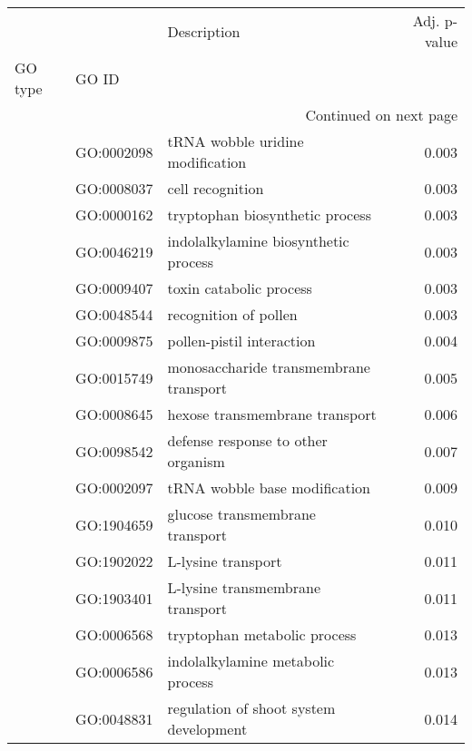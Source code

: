 \begin{longtable}{lllr}
\toprule
   &            &                                  Description &  Adj. p-value \\
GO type & GO ID &                                              &               \\
\midrule
\endhead
\midrule
\multicolumn{4}{r}{{Continued on next page}} \\
\midrule
\endfoot

\bottomrule
\endlastfoot
\multirow{45}{*}{BP} & GO:0002098 &             tRNA wobble uridine modification &         0.003 \\
   & GO:0008037 &                             cell recognition &         0.003 \\
   & GO:0000162 &              tryptophan biosynthetic process &         0.003 \\
   & GO:0046219 &         indolalkylamine biosynthetic process &         0.003 \\
   & GO:0009407 &                      toxin catabolic process &         0.003 \\
   & GO:0048544 &                        recognition of pollen &         0.003 \\
   & GO:0009875 &                    pollen-pistil interaction &         0.004 \\
   & GO:0015749 &       monosaccharide transmembrane transport &         0.005 \\
   & GO:0008645 &               hexose transmembrane transport &         0.006 \\
   & GO:0098542 &           defense response to other organism &         0.007 \\
   & GO:0002097 &                tRNA wobble base modification &         0.009 \\
   & GO:1904659 &              glucose transmembrane transport &         0.010 \\
   & GO:1902022 &                           L-lysine transport &         0.011 \\
   & GO:1903401 &             L-lysine transmembrane transport &         0.011 \\
   & GO:0006568 &                 tryptophan metabolic process &         0.013 \\
   & GO:0006586 &            indolalkylamine metabolic process &         0.013 \\
   & GO:0048831 &       regulation of shoot system development &         0.014 \\

\end{longtable}
